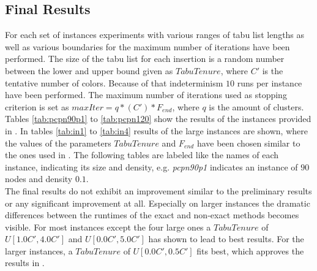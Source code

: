 \subsection{Final Results}
For each set of instances experiments with various ranges of tabu list lengths as well as various boundaries for the maximum number of iterations have been performed. The size of the tabu list for each insertion is a random number between the lower and upper bound given as $TabuTenure$, where $C'$ is the tentative number of colors. Because of that indeterminism $10$ runs per instance have been performed. The maximum number of iterations used as stopping criterion is set as $maxIter=q*(C')*F_{end}$, where $q$ is the amount of clusters. Tables \ref{tab:pcpn90p1} to \ref{tab:pcpn120} show the results of the instances provided in \cite{frota-07}. In tables \ref{tab:in1} to \ref{tab:in4} results of the large instances are shown, where the values of the parameters $TabuTenure$ and $F_{end}$ have been chosen similar to the ones used in \cite{noronha-06}. The following tables are labeled like the names of each instance, indicating its size and density, e.g. \textit{pcpn90p1} indicates an instance of $90$ nodes and density $0.1$.\\
The final results do not exhibit an improvement similar to the preliminary results or any significant improvement at all. Especially on larger instances the dramatic differences between the runtimes of the exact and non-exact methods becomes visible. For most instances except the four large ones a $TabuTenure$ of $U[1.0C',4.0C']$ and $U[0.0C',5.0C']$ has shown to lead to best results. For the larger instances, a $TabuTenure$ of $U[0.0C',0.5C']$ fits best, which approves the results in \cite{noronha-06}.


